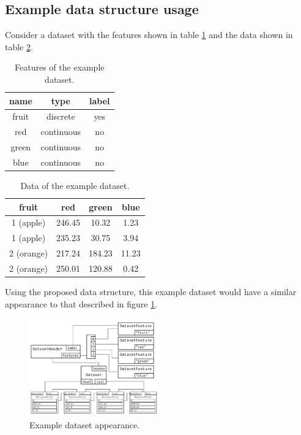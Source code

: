 \documentclass{acm_proc_article-sp}
\begin{document}
\subsection{Example data structure usage}
Consider a dataset with the features shown in table \ref{table:1} and the data shown in table \ref{table:2}.
\begin{table}[h]
  \centering
  \begin{tabular}{|c|c|c|}
    \hline
    name                       & type       & label            \\ \hline
    fruit                      & discrete   & yes              \\
    red                        & continuous & no               \\
    green                      & continuous & no               \\
    blue                       & continuous & no               \\ \hline
  \end{tabular}
  \caption{Features of the example dataset.}
  \label{table:1}
\end{table}
\begin{table}[h]
  \centering
  \begin{tabular}{|c|c|c|c|}
    \hline
    fruit                      & red         & green  & blue  \\ \hline
    1 (apple)                      & 246.45      & 10.32  & 1.23  \\
    1 (apple)                      & 235.23      & 30.75  & 3.94  \\
    2 (orange)                     & 217.24      & 184.23 & 11.23 \\
    2 (orange)                     & 250.01      & 120.88 & 0.42  \\ \hline
  \end{tabular}
  \caption{Data of the example dataset.}
  \label{table:2}
\end{table}
Using the proposed data structure, this example dataset would have a similar appearance to that described in figure \ref{fig:examplevisualization}.
\begin{figure}[h]
  \centering
  \includegraphics[width=0.5\textwidth]{examplerepresentation}
  \caption{Example dataset appearance.}
  \label{fig:examplevisualization}
\end{figure}
\end{document}
